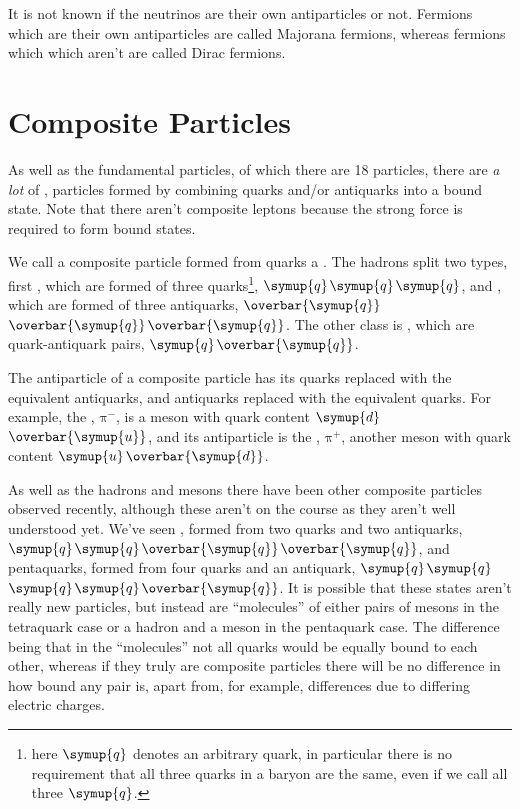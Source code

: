 \documentclass[fleqn]{NotesClass}
\newcommand{\Pparticle}[1]{\symup{#1}}
\newcommand{\Pu}{\ensuremath{\Pparticle{u}}}
\newcommand{\Pd}{\ensuremath{\Pparticle{d}}}
\newcommand{\Pq}{\ensuremath{\Pparticle{q}}}
\newcommand{\Ppip}{\ensuremath{\text{π}^{+}}}
\newcommand{\Ppim}{\ensuremath{\text{π}^{-}}}
\newcommand{\APantiparticle}[1]{\overbar{#1}}
\newcommand{\APu}{\ensuremath{\APantiparticle{\Pparticle{u}}}}
\newcommand{\APd}{\ensuremath{\APantiparticle{\Pparticle{d}}}}
\newcommand{\APq}{\ensuremath{\APantiparticle{\Pparticle{q}}}}
\begin{document}
    \begin{openquestion}{}{}
        It is not known if the neutrinos are their own antiparticles or not.
        Fermions which are their own antiparticles are called Majorana fermions, whereas fermions which which aren't are called Dirac fermions.
    \end{openquestion}
    
    \section{Composite Particles}
    As well as the fundamental particles, of which there are 18 particles, there are \emph{a lot} of , particles formed by combining quarks and/or antiquarks into a bound state.
    Note that there aren't composite leptons because the strong force is required to form bound states.
    
    We call a composite particle formed from quarks a .
    The hadrons split two types, first , which are formed of three quarks\footnote{here \Pq{} denotes an arbitrary quark, in particular there is no requirement that all three quarks in a baryon are the same, even if we call all three \Pq.}, \Pq\Pq\Pq, and , which are formed of three antiquarks, \APq\APq\APq.
    The other class is , which are quark-antiquark pairs, \Pq\APq.
    
    The antiparticle of a composite particle has its quarks replaced with the equivalent antiquarks, and antiquarks replaced with the equivalent quarks.
    For example, the , \Ppim\index{\Ppim|see{negative pion}}, is a meson with quark content \Pd\APu, and its antiparticle is the , \Ppip\index{\Ppip|see{positive pion}}, another meson with quark content \Pu\APd.
    
    As well as the hadrons and mesons there have been other composite particles observed recently, although these aren't on the course as they aren't well understood yet.
    We've seen , formed from two quarks and two antiquarks, \Pq\Pq\APq\APq, and pentaquarks, formed from four quarks and an antiquark, \Pq\Pq\Pq\Pq\APq.
    It is possible that these states aren't really new particles, but instead are \enquote{molecules} of either pairs of mesons in the tetraquark case or a hadron and a meson in the pentaquark case.
    The difference being that in the \enquote{molecules} not all quarks would be equally bound to each other, whereas if they truly are composite particles there will be no difference in how bound any pair is, apart from, for example, differences due to differing electric charges.
    
\end{document}
